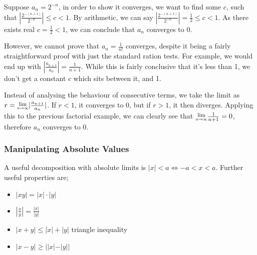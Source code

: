 \documentclass[a4paper, 12pt]{article}
\newcommand{\limit}[2]{\raisebox{0.5ex}{\scalebox{0.8}{$\displaystyle{\lim_{#1 \to #2}}$}}}
\begin{document}
                Suppose $a_n = 2^{-n}$, in order to show it converges, we want to find some $c$, such that $|\frac{2^{-(n + 1)}}{2^{-n}}| \leq c < 1$. By arithmetic, we can say $|\frac{2^{-(n + 1)}}{2^{-n}}| = \frac{1}{2} \leq c < 1$. As there exists real $c = \frac{1}{2} < 1$, we can conclude that $a_n$ converges to 0.
                \medskip

                However, we cannot prove that $a_n = \frac{1}{n!}$ converges, despite it being a fairly straightforward proof with just the standard ration tests. For example, we would end up with $|\frac{a_{n + 1}}{a_n}| = \frac{1}{n + 1}$. While this is fairly conclusive that it's less than 1, we don't get a constant $c$ which sits between it, and 1.
                \medskip

                Instead of analysing the behaviour of consecutive terms, we take the limit as $r = \limit{n}{\infty}|\frac{a_{n + 1}}{a_n}|$. If $r < 1$, it converges to 0, but if $r > 1$, it then diverges. Applying this to the previous factorial example, we can clearly see that $\limit{n}{\infty}\frac{1}{n + 1} = 0$, therefore $a_n$ converges to 0.
            \subsubsection*{Manipulating Absolute Values}
                A useful decomposition with absolute limits is $|x| < a \Leftrightarrow -a < x < a$. Further useful properties are;
                \begin{itemize}
                    \itemsep0em
                    \item $|xy| = |x| \cdot |y|$
                    \item $|\frac{x}{y}| = \frac{|x|}{|y|}$
                    \item $|x + y| \leq |x| + |y|$ \hfill triangle inequality
                    \item $|x - y| \geq ||x| - |y||$
                \end{itemize}
\end{document}

